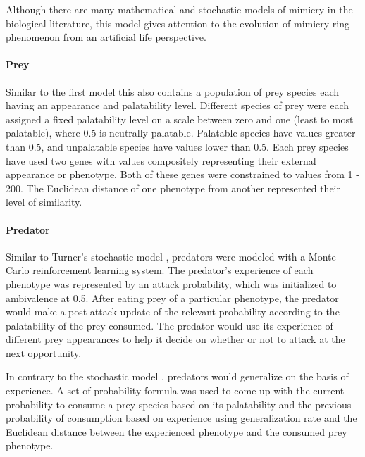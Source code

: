 \documentclass[letterpaper]{article}
\numberwithin{equation}{section}
\begin{document}
Although there are many mathematical and stochastic models of mimicry in the biological literature, this model gives attention to the evolution of mimicry ring phenomenon from an artificial life perspective.

\paragraph{Prey}
Similar to the first model this also contains a population of prey species each having an appearance and palatability level. Different species of prey were each assigned a fixed palatability level on a scale between zero and one (least to most palatable), where 0.5 is neutrally palatable. Palatable species have values greater than 0.5, and unpalatable species have values lower than 0.5. Each prey species have used two genes with values compositely representing their external appearance or phenotype. Both of these genes were constrained to values from 1 - 200. The Euclidean distance of one phenotype from another represented their level of similarity.

\paragraph{Predator}
Similar to Turner's stochastic model \cite{turner_et_al1984},  predators were modeled with a Monte Carlo reinforcement learning system. The predator's experience of each phenotype was represented by an attack probability, which was initialized to ambivalence at 0.5. After eating prey of a particular phenotype, the predator would make a post-attack update of the relevant probability according to the palatability of the prey consumed. The predator would use its experience of different prey appearances to help it decide on whether or not to attack at the next opportunity.

In contrary to the stochastic model \cite{turner_et_al1984},  predators would generalize on the basis of experience. A set of probability formula was used to come up with the current probability to consume a prey species based on its palatability and the previous probability of consumption based on experience using generalization rate and the Euclidean distance between the experienced phenotype and the consumed prey phenotype. 

\end{document}

